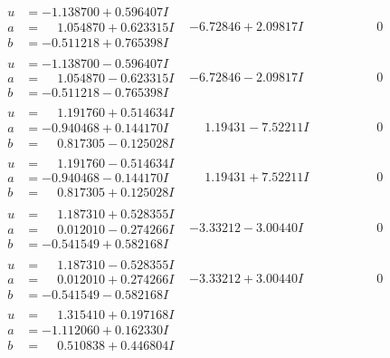 \documentclass[1p]{elsarticle_modified}
\theoremstyle{definition}
\begin{document}
$$\begin{array}{c|c|c}
\begin{aligned}
u &= -1.138700 + 0.596407 I \\
a &= \phantom{-}1.054870 + 0.623315 I \\
b &= -0.511218 + 0.765398 I\end{aligned}
 & -6.72846 + 2.09817 I & \phantom{-0.000000 } 0 \\ \hline\begin{aligned}
u &= -1.138700 - 0.596407 I \\
a &= \phantom{-}1.054870 - 0.623315 I \\
b &= -0.511218 - 0.765398 I\end{aligned}
 & -6.72846 - 2.09817 I & \phantom{-0.000000 } 0 \\ \hline\begin{aligned}
u &= \phantom{-}1.191760 + 0.514634 I \\
a &= -0.940468 + 0.144170 I \\
b &= \phantom{-}0.817305 - 0.125028 I\end{aligned}
 & \phantom{-}1.19431 - 7.52211 I & \phantom{-0.000000 } 0 \\ \hline\begin{aligned}
u &= \phantom{-}1.191760 - 0.514634 I \\
a &= -0.940468 - 0.144170 I \\
b &= \phantom{-}0.817305 + 0.125028 I\end{aligned}
 & \phantom{-}1.19431 + 7.52211 I & \phantom{-0.000000 } 0 \\ \hline\begin{aligned}
u &= \phantom{-}1.187310 + 0.528355 I \\
a &= \phantom{-}0.012010 - 0.274266 I \\
b &= -0.541549 + 0.582168 I\end{aligned}
 & -3.33212 - 3.00440 I & \phantom{-0.000000 } 0 \\ \hline\begin{aligned}
u &= \phantom{-}1.187310 - 0.528355 I \\
a &= \phantom{-}0.012010 + 0.274266 I \\
b &= -0.541549 - 0.582168 I\end{aligned}
 & -3.33212 + 3.00440 I & \phantom{-0.000000 } 0 \\ \hline\begin{aligned}
u &= \phantom{-}1.315410 + 0.197168 I \\
a &= -1.112060 + 0.162330 I \\
b &= \phantom{-}0.510838 + 0.446804 I\end{aligned}

\end{array}$$
\end{document}
